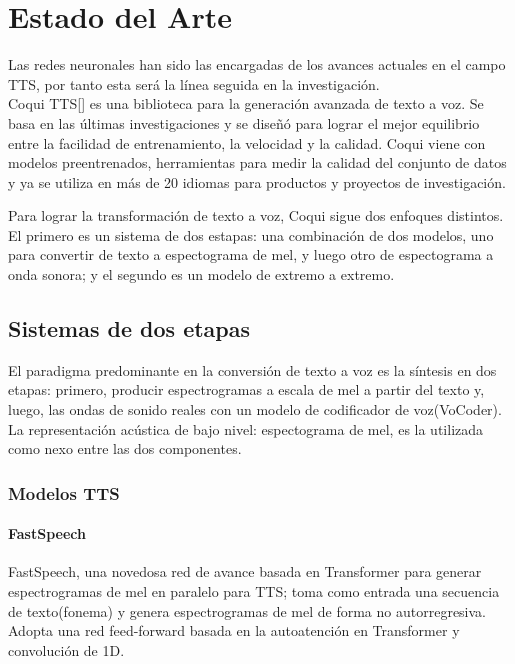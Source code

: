 \chapter{Estado del Arte}\label{chapter:state-of-the-art}

Las redes neuronales han sido las encargadas de los avances actuales en el campo TTS, por tanto esta será la línea seguida en la investigación. \\


Coqui TTS[\cite{coqui-doc}] es una biblioteca para la generación avanzada de texto a voz. Se basa en las últimas investigaciones y se diseñó para lograr el mejor equilibrio entre la facilidad de entrenamiento, la velocidad y la calidad. Coqui viene con modelos preentrenados, herramientas para medir la calidad del conjunto de datos y ya se utiliza en más de 20 idiomas para productos y proyectos de investigación.


Para lograr la transformación de texto a voz, Coqui sigue dos enfoques distintos. El primero es un sistema de dos estapas: una combinación de dos modelos, uno para convertir de texto a espectograma de mel, y luego otro de espectograma a onda sonora; y el segundo es un modelo de extremo a extremo.  

\section{Sistemas de dos etapas}

El paradigma predominante en la conversión de texto a voz es la síntesis en dos etapas: primero, producir espectrogramas a escala de mel a partir del texto y, luego, las ondas de sonido reales con un modelo de codificador de voz(VoCoder). La representación acústica de bajo nivel: espectograma de mel, es la utilizada como nexo entre las dos componentes.


\subsection{Modelos TTS}

\subsubsection{FastSpeech}

FastSpeech, una novedosa red de avance basada en Transformer para generar espectrogramas de mel en paralelo para TTS; toma como entrada una secuencia de texto(fonema) y genera espectrogramas de mel de forma no autorregresiva. Adopta una red feed-forward basada en la autoatención en Transformer y convolución de 1D. 

